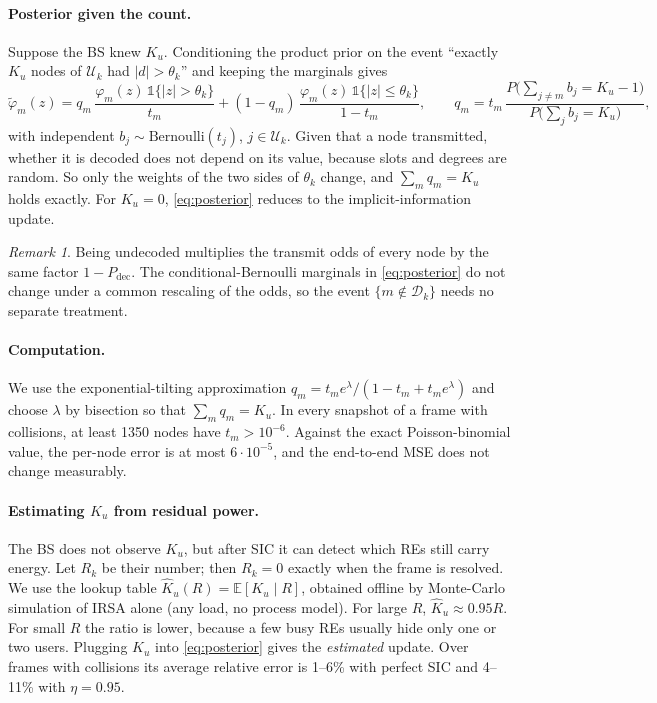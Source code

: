 \documentclass[10pt]{article}
\theoremstyle{remark}
\newtheorem{remark}{Remark}
\theoremstyle{definition}
\newcommand{\Kh}{\hat K_u}
\newcommand{\Dset}{\mathcal D}
\newcommand{\Uset}{\mathcal U}
\newcommand{\ind}{\mathbb 1}
\begin{document}
\paragraph{Posterior given the count.}
Suppose the BS knew $K_u$. Conditioning the product prior on the event
``exactly $K_u$ nodes of $\Uset_k$ had $|d|>\theta_k$'' and keeping the marginals gives
\begin{equation}
  \label{eq:posterior}
  \tilde\varphi_m(z) = q_m\,\frac{\varphi_m(z)\,\ind\{|z|>\theta_k\}}{t_m}
  + (1-q_m)\,\frac{\varphi_m(z)\,\ind\{|z|\le\theta_k\}}{1-t_m},
  \qquad
  q_m = t_m\,\frac{P\big(\sum_{j\ne m} b_j = K_u-1\big)}{P\big(\sum_{j} b_j = K_u\big)},
\end{equation}
with independent $b_j\sim\mathrm{Bernoulli}(t_j)$, $j\in\Uset_k$. Given that a node transmitted,
whether it is decoded does not depend on its value, because slots and degrees are random. So only
the weights of the two sides of $\theta_k$ change, and $\sum_m q_m = K_u$ holds exactly.
For $K_u=0$, \eqref{eq:posterior} reduces to the implicit-information update.

\begin{remark}
  Being undecoded multiplies the transmit odds of every node by the same factor
  $1-P_{\mathrm{dec}}$. The conditional-Bernoulli marginals in \eqref{eq:posterior}
  do not change under a common rescaling of the odds, so the event $\{m\notin\Dset_k\}$ needs no
  separate treatment.
\end{remark}

\paragraph{Computation.} We use the exponential-tilting approximation
$q_m = t_m e^{\lambda}/(1-t_m+t_m e^{\lambda})$ and choose $\lambda$ by bisection so that
$\sum_m q_m = K_u$. In every snapshot of a frame with collisions, at least 1350 nodes have $t_m>10^{-6}$.
Against the exact Poisson-binomial value, the per-node error is at most $6\cdot10^{-5}$,
and the end-to-end MSE does not change measurably.

\paragraph{Estimating $K_u$ from residual power.} The BS does not observe $K_u$, but after
SIC it can detect which REs still carry energy. Let $R_k$ be their number; then
$R_k=0$ exactly when the frame is resolved. We use the lookup table
$\Kh(R) = \mathbb E[K_u\mid R]$, obtained offline by Monte-Carlo simulation of IRSA alone
(any load, no process model). For large $R$, $\Kh \approx 0.95R$. For small $R$ the ratio is
lower, because a few busy REs usually hide only one or two users. Plugging $\Kh$ into
\eqref{eq:posterior} gives the \emph{estimated} update. Over frames with collisions its average relative
error is 1--6\% with perfect SIC and 4--11\% with $\eta=0.95$.
\end{document}

